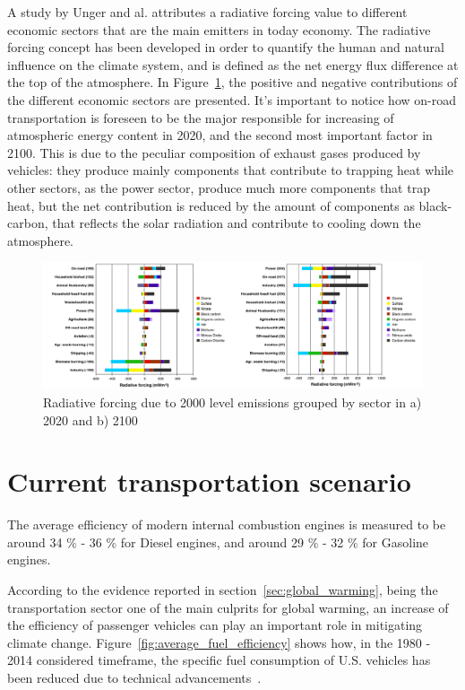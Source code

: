 A study by Unger and al. \cite{Unger2010} attributes a radiative forcing value to different economic sectors that are the main emitters in today economy. The radiative forcing concept has been developed in order to quantify the human and natural influence on the climate system, and is defined as the net energy flux difference at the top of the atmosphere. In Figure~\ref{fig:radiative_forcing}, the positive and negative contributions of the different economic sectors are presented. It's important to notice how on-road transportation is foreseen to be the major responsible for increasing of atmospheric energy content in 2020, and the second most important factor in 2100. This is due to the peculiar composition of exhaust gases produced by vehicles: they produce mainly components that contribute to trapping heat while other sectors, as the power sector, produce much more components that trap heat, but the net contribution is reduced by the amount of components as black-carbon, that reflects the solar radiation and contribute to cooling down the atmosphere. 

\begin{figure}[ht]
  \centering
  \includegraphics[width=\textwidth]{figures/introduction/radiative_forcing.png}
  \caption{Radiative forcing due to 2000 level emissions grouped by sector in a) 2020 and b) 2100 \label{fig:radiative_forcing}}
\end{figure}

\section{Current transportation scenario}

The average efficiency of modern internal combustion engines is measured to be around 34 \% - 36 \% for Diesel engines, and around 29 \% - 32 \% for Gasoline engines.

According to the evidence reported in section~\ref{sec:global_warming}, being the transportation sector one of the main culprits for global warming, an increase of the efficiency of passenger vehicles can play an important role in mitigating climate change. Figure~\ref{fig:average_fuel_efficiency} shows how, in the 1980 - 2014 considered timeframe, the specific fuel consumption of U.S. vehicles has been reduced due to technical advancements~\cite{BureauofTransportationStatistics2016}.

